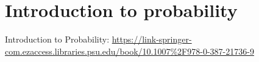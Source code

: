 \section{Introduction to probability}
Introduction to Probability:  \url{https://link-springer-com.ezaccess.libraries.psu.edu/book/10.1007\%2F978-0-387-21736-9}